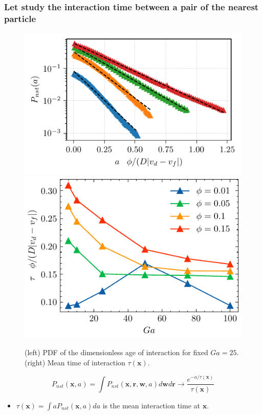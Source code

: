 \documentclass{sintefbeamer}
\begin{document}
\begin{frame}
  \frametitle{Let study the interaction time between  a pair of the nearest particle}
    \begin{figure}
        \includegraphics[height=0.23\textwidth]{image/HOMOGENEOUS/fDrop/P_a_Ga_25.pdf}
        \includegraphics[height=0.23\textwidth]{image/HOMOGENEOUS/fPA/ageGa.pdf}
        \caption{ (left) PDF of the dimensionless age of interaction for fixed $Ga = 25$.
      (right) Mean time of interaction $\tau(\textbf{x})$.}
    \end{figure}
  \begin{equation*}
    P_{nst}(\textbf{x},a) 
    = \int P_{nst}(\textbf{x},\textbf{r},\textbf{w},a) d\textbf{w}d\textbf{r}
    \rightarrow\frac{e^{-a/\tau(\textbf{x})}}{\tau(\textbf{x})}
  \end{equation*}
\begin{itemize}
  \item $\tau(\textbf{x}) = \int a P_{nst}(\textbf{x},a) da$ is the mean interaction time at $\textbf{x}$. 
\end{itemize}
\end{frame}
\end{document}

